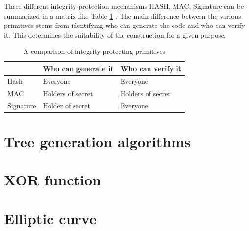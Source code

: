 	Three different integrity-protection mechanisms HASH, MAC, Signature can be summarized in a matrix like Table \ref{table:summary} \cite{2002-Stajano-ubiquitous}.
	The main difference between the various primitives stems from identifying who can generate the code and who can verify it.
	This determines the suitability of the construction for a given purpose.
	\begin{table}[!htb]	
		\begin{center}
			\begin{tabular}{ |l| l| l| }
		    \hline
		     & Who can generate it & Who can verify it \\
		    \hline
		    Hash & Everyone & Everyone \\	
		    \hline
		    MAC & Holders of secret & Holders of secret \\
		    \hline
		    Signature & Holder of secret & Everyone \\
		    \hline
			\end{tabular}
		\end{center}
		\caption{A comparison of integrity-protecting primitives}
	  \label{table:summary}
	\end{table}

\section {Tree generation algorithms}

\section{XOR function}

\section{Elliptic curve}